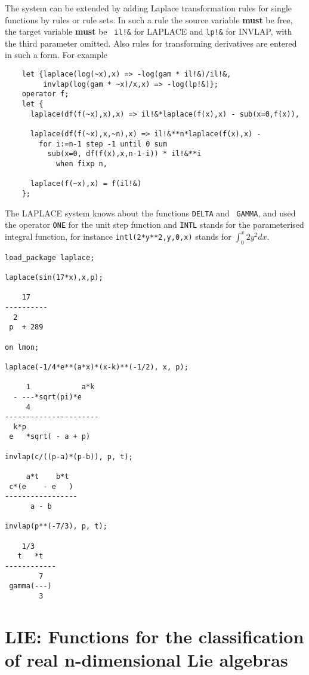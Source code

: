 \documentclass[11pt,letterpaper]{book}
\begin{document}
The system can be extended by adding Laplace transformation rules for
single functions by rules or rule sets.  In such a rule the source
variable {\bf must} be free, the target variable {\bf must} be {\tt
il!\&} for LAPLACE and {\tt lp!\&} for INVLAP, with the third parameter
omitted.  Also rules for transforming derivatives are entered in such
a form.  For example
{\small\begin{verbatim}
    let {laplace(log(~x),x) => -log(gam * il!&)/il!&,
         invlap(log(gam * ~x)/x,x) => -log(lp!&)};
    operator f;
    let {
      laplace(df(f(~x),x),x) => il!&*laplace(f(x),x) - sub(x=0,f(x)),

      laplace(df(f(~x),x,~n),x) => il!&**n*laplace(f(x),x) -
        for i:=n-1 step -1 until 0 sum
          sub(x=0, df(f(x),x,n-1-i)) * il!&**i
            when fixp n,

      laplace(f(~x),x) = f(il!&)
    };
\end{verbatim}}

The LAPLACE system knows about the functions {\tt DELTA} and {\tt
GAMMA}, and used the operator {\tt ONE} for the unit step function and
{\tt INTL} stands for the parameterised integral function, for
instance  {\tt intl(2*y**2,y,0,x)} stands for $\int^x_0 2 y^2 dx$.

{\small\begin{verbatim}
load_package laplace;

laplace(sin(17*x),x,p);

    17
----------
  2
 p  + 289

on lmon;

laplace(-1/4*e**(a*x)*(x-k)**(-1/2), x, p);

     1            a*k
  - ---*sqrt(pi)*e
     4
----------------------
  k*p
 e   *sqrt( - a + p)

invlap(c/((p-a)*(p-b)), p, t);

     a*t    b*t
 c*(e    - e   )
-----------------
      a - b

invlap(p**(-7/3), p, t);

    1/3
   t   *t
------------
        7
 gamma(---)
        3
\end{verbatim}}

\chapter[LIE: Classification of Lie algebras]%
 {LIE: Functions for the classification of real n-dimensional Lie algebras}
\label{LIE}
\end{document}

